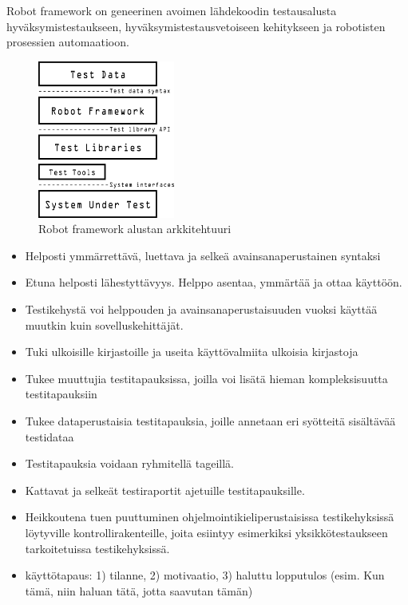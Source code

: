   Robot framework on geneerinen avoimen lähdekoodin testausalusta hyväksymistestaukseen, hyväksymistestausvetoiseen kehitykseen ja robotisten prosessien automaatioon.

  \begin{figure}[H]
    \centering
    \includegraphics[width=0.4\textwidth]{assets/robot-architecture.png}
    \caption{Robot framework alustan arkkitehtuuri}
    \label{fig:robot-architecture}
  \end{figure}

  \begin{itemize}
    \item Helposti ymmärrettävä, luettava ja selkeä avainsanaperustainen syntaksi
    \item Etuna helposti lähestyttävyys. Helppo asentaa, ymmärtää ja ottaa käyttöön.
    \item Testikehystä voi helppouden ja avainsanaperustaisuuden vuoksi käyttää muutkin kuin sovelluskehittäjät.
    \item Tuki ulkoisille kirjastoille ja useita käyttövalmiita ulkoisia kirjastoja
    \item Tukee muuttujia testitapauksissa, joilla voi lisätä hieman kompleksisuutta testitapauksiin
    \item Tukee dataperustaisia testitapauksia, joille annetaan eri syötteitä sisältävää testidataa
    \item Testitapauksia voidaan ryhmitellä tageillä.
    \item Kattavat ja selkeät testiraportit ajetuille testitapauksille.
    \item Heikkoutena tuen puuttuminen ohjelmointikieliperustaisissa testikehyksissä löytyville kontrollirakenteille, joita esiintyy esimerkiksi yksikkötestaukseen tarkoitetuissa testikehyksissä.
    \item käyttötapaus: 1) tilanne, 2) motivaatio, 3) haluttu lopputulos (esim. Kun tämä, niin haluan tätä, jotta saavutan tämän)
  \end{itemize}

